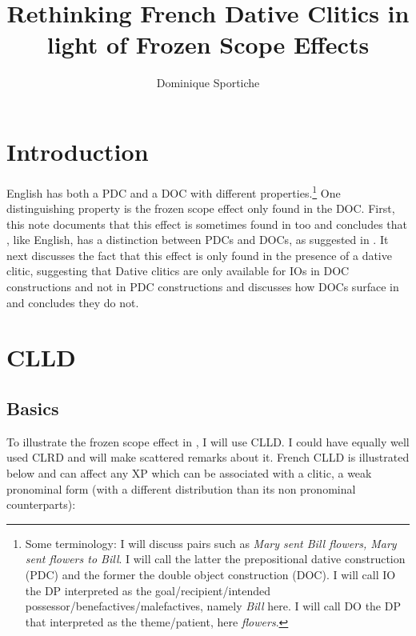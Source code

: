 \documentclass[output=paper]{langsci/langscibook}
\author{Dominique Sportiche\affiliation{University of California, Los Angeles}}
\title{Rethinking French Dative Clitics in light of Frozen Scope Effects}
\begin{document}
\glsresetall

\section{Introduction}

English has both a \gls{PDC} and a
\gls{DOC} with different
properties.\footnote{Some terminology: I will discuss pairs such as {\it Mary
    sent Bill flowers, Mary sent flowers to Bill}.  I will call the latter the
    prepositional dative construction (\gls{PDC}) and the former the double
    object construction (\gls{DOC}). I will call \gls{IO} the DP interpreted as
    the goal/recipient/intended possessor/benefactives/malefactives, namely
{\it Bill} here. I will call \gls{DO} the DP that interpreted as the
theme/patient, here {\it flowers}.} One distinguishing property is the frozen
scope effect only found in the DOC.  First, this note documents that this
effect is sometimes found in  too and concludes that , like
English, has a distinction between \glspl{PDC} and \glspl{DOC}, as suggested in
\cite{anagnostopoulou2005cross}.  It next discusses the fact that this effect
is only found in the presence of a dative clitic, suggesting that Dative
clitics are only available for \glspl{IO} in DOC constructions and not in
\gls{PDC} constructions and  discusses how \glspl{DOC} surface in  and concludes they do not.

\section{CLLD}

\subsection{Basics}\label{clld-htld}

To illustrate the frozen scope effect in , I will use \gls{CLLD}. I
could have equally well used \gls{CLRD} and will make scattered remarks about
it.  French \gls{CLLD} is illustrated below and can
affect any XP which can be associated with a clitic, a weak pronominal form
(with a different distribution than its non pronominal counterparts):
\end{document}
